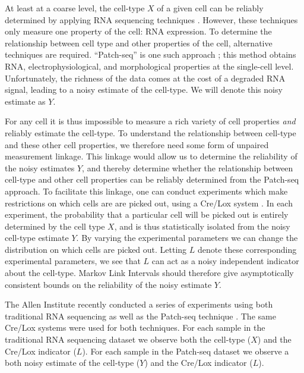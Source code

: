 \documentclass{article}
\theoremstyle{definition}
\begin{document}
At least at a coarse level, the cell-type $X$ of a given cell can be reliably determined by applying RNA sequencing techniques \cite{okaty2011cell}.  However, these techniques only measure one property of the cell: RNA expression. To determine the relationship between cell type and other properties of the cell, alternative techniques are required.  ``Patch-seq'' is one such approach \cite{cadwell2016electrophysiological}; this method obtains RNA, electrophysiological, and morphological properties at the single-cell level.  Unfortunately, the richness of the data comes at the cost of a degraded RNA signal, leading to a noisy estimate of the cell-type.  We will denote this noisy estimate as $Y$.  

For any cell it is thus impossible to measure a rich variety of cell properties \emph{and} reliably estimate the cell-type.  To understand the relationship between cell-type and these other cell properties, we therefore need some form of unpaired measurement linkage.  This linkage would allow us to determine the reliability of the noisy estimates $Y$, and thereby determine whether the relationship between cell-type and other cell properties can be reliably determined from the Patch-seq approach.  To facilitate this linkage, one can conduct experiments which make restrictions on which cells are are picked out, using a Cre/Lox system \cite{tasic2017shared}.  In each experiment, the probability that a particular cell will be picked out is entirely determined by the cell type $X$, and is thus statistically isolated from the noisy cell-type estimate $Y$.  By varying the experimental parameters we can change the distribution on which cells are picked out.  Letting $L$ denote these corresponding experimental parameters, we see that $L$ can act as a noisy independent indicator about the cell-type.  Markov Link Intervals should therefore give asymptotically consistent bounds on the reliability of the noisy estimate $Y$.  

The Allen Institute recently conducted a series of experiments using both traditional RNA sequencing as well as the Patch-seq technique \cite{tasic2017shared}.  The same Cre/Lox systems were used for both techniques.  For each sample in the traditional RNA sequencing dataset we observe both the cell-type ($X$) and the Cre/Lox indicator ($L$).  For each sample in the Patch-seq dataset we observe a both noisy estimate of the cell-type ($Y$) and the Cre/Lox indicator ($L$).  
\end{document}
